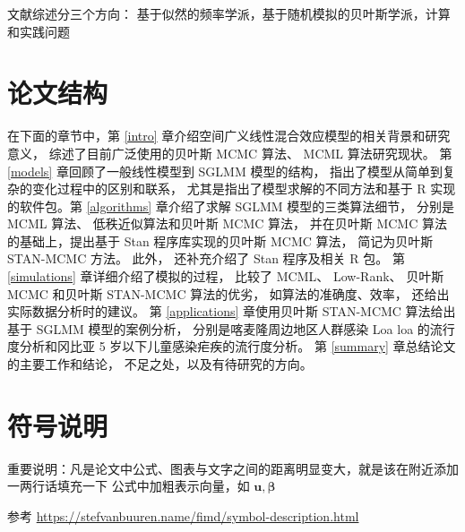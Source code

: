 \documentclass[12pt,a4paper,UTF8,twoside]{book}
\theoremstyle{definition}
\theoremstyle{definition}
\theoremstyle{definition}
\theoremstyle{remark}
\begin{document}
文献综述分三个方向：
基于似然的频率学派，基于随机模拟的贝叶斯学派，计算和实践问题

\hypertarget{stracture}{%
\section{论文结构}\label{stracture}}

在下面的章节中，第 \ref{intro}
章介绍空间广义线性混合效应模型的相关背景和研究意义，
综述了目前广泛使用的贝叶斯 MCMC 算法、 MCML 算法研究现状。 第
\ref{models} 章回顾了一般线性模型到 SGLMM 模型的结构，
指出了模型从简单到复杂的变化过程中的区别和联系，
尤其是指出了模型求解的不同方法和基于 R 实现的软件包。第 \ref{algorithms}
章介绍了求解 SGLMM 模型的三类算法细节， 分别是 MCML 算法、
低秩近似算法和贝叶斯 MCMC 算法， 并在贝叶斯 MCMC 算法的基础上，提出基于
Stan 程序库实现的贝叶斯 MCMC 算法， 简记为贝叶斯 STAN-MCMC 方法。 此外，
还补充介绍了 Stan 程序及相关 R 包。 第 \ref{simulations}
章详细介绍了模拟的过程， 比较了 MCML、 Low-Rank、 贝叶斯 MCMC 和贝叶斯
STAN-MCMC 算法的优劣， 如算法的准确度、效率，
还给出实际数据分析时的建议。 第 \ref{applications} 章使用贝叶斯
STAN-MCMC 算法给出基于 SGLMM 模型的案例分析，
分别是喀麦隆周边地区人群感染 Loa loa 的流行度分析和冈比亚 5
岁以下儿童感染疟疾的流行度分析。 第 \ref{summary}
章总结论文的主要工作和结论， 不足之处，以及有待研究的方向。

\hypertarget{Conventions-Colophon}{%
\section{符号说明}\label{Conventions-Colophon}}

重要说明：凡是论文中公式、图表与文字之间的距离明显变大，就是该在附近添加一两行话填充一下
公式中加粗表示向量，如 \(\mathbf{u},\boldsymbol{\beta}\)

参考 \url{https://stefvanbuuren.name/fimd/symbol-description.html}
\end{document}
